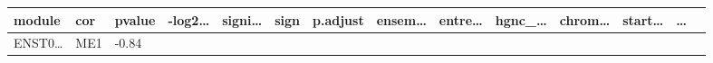\documentclass[
]{article}
\begin{document}
\begin{longtable}[]{@{}llllllllllllll@{}}
\begin{minipage}[b]{0.04\columnwidth}
module\strut
\end{minipage} & \begin{minipage}[b]{0.04\columnwidth}\raggedright
cor\strut
\end{minipage} & \begin{minipage}[b]{0.04\columnwidth}\raggedright
pvalue\strut
\end{minipage} & \begin{minipage}[b]{0.05\columnwidth}\raggedright
-log2\ldots{}\strut
\end{minipage} & \begin{minipage}[b]{0.05\columnwidth}\raggedright
signi\ldots{}\strut
\end{minipage} & \begin{minipage}[b]{0.03\columnwidth}\raggedright
sign\strut
\end{minipage} & \begin{minipage}[b]{0.05\columnwidth}\raggedright
p.adjust\strut
\end{minipage} & \begin{minipage}[b]{0.05\columnwidth}\raggedright
ensem\ldots{}\strut
\end{minipage} & \begin{minipage}[b]{0.05\columnwidth}\raggedright
entre\ldots{}\strut
\end{minipage} & \begin{minipage}[b]{0.05\columnwidth}\raggedright
hgnc\_\ldots{}\strut
\end{minipage} & \begin{minipage}[b]{0.05\columnwidth}\raggedright
chrom\ldots{}\strut
\end{minipage} & \begin{minipage}[b]{0.05\columnwidth}\raggedright
start\ldots{}\strut
\end{minipage} & \begin{minipage}[b]{0.02\columnwidth}\raggedright
\ldots{}\strut
\end{minipage}\tabularnewline
\midrule
\endhead
\begin{minipage}[t]{0.05\columnwidth}\raggedright
ENST0\ldots{}\strut
\end{minipage} & \begin{minipage}[t]{0.04\columnwidth}\raggedright
ME1\strut
\end{minipage} & \begin{minipage}[t]{0.04\columnwidth}\raggedright
-0.84\strut
\end{minipage} & \begin{minipage}[t]{0.04\columnwidth}\raggedright

\end{minipage}
\end{longtable}
\end{document}
